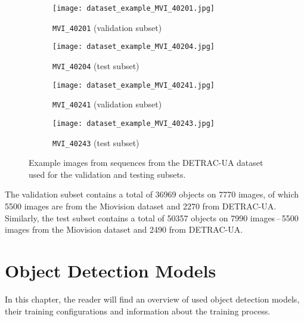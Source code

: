 \begin{figure}
    \centering
    \begin{subfigure}[b]{0.475\textwidth}
        \texttt{[image: dataset\_example\_MVI\_40201.jpg]}
        \caption{\texttt{MVI\_40201} (validation subset)}
    \end{subfigure}
    \begin{subfigure}[b]{0.475\textwidth}
        \texttt{[image: dataset\_example\_MVI\_40204.jpg]}
        \caption{\texttt{MVI\_40204} (test subset)}
    \end{subfigure}
    \begin{subfigure}[b]{0.475\textwidth}
        \texttt{[image: dataset\_example\_MVI\_40241.jpg]}
        \caption{\texttt{MVI\_40241} (validation subset)}
    \end{subfigure}
    \begin{subfigure}[b]{0.475\textwidth}
        \texttt{[image: dataset\_example\_MVI\_40243.jpg]}
        \caption{\texttt{MVI\_40243} (test subset)}
    \end{subfigure}
    \caption{Example images from sequences from the DETRAC-UA dataset used for
    the validation and testing subsets.}
    \label{TestValExamples}
\end{figure}

The validation subset contains a total of \num{36969} objects on \num{7770}
images, of which \num{5500} images are from the Miovision dataset and \num{2270}
from DETRAC-UA. Similarly, the test subset contains a total of \num{50357}
objects on \num{7990} images\,--\,\num{5500} images from the Miovision dataset and
\num{2490} from DETRAC-UA.




\chapter{Object Detection Models}
\label{ModelsChapter}





In this chapter, the reader will find an overview of used object detection
models, their training configurations and information about the training
process.


